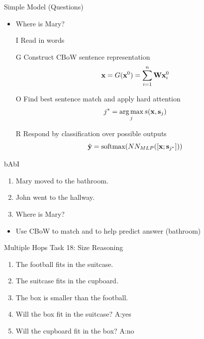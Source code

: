 \documentclass{beamer}
\begin{document}
\begin{frame}{Simple Model (Questions)}
  \begin{itemize}
  \item Where is Mary?
  \end{itemize}

  \begin{itemize}
  \item[I] Read in words
  \item[G] Construct CBoW sentence representation 
    \[\mathbf{x} = G(\mathbf{x}^0) =  \sum_{i=1}^n \mathbf{W} \mathbf{x}^0_i\]
  \item[O] Find best sentence match and apply hard attention
    \[j^* = \argmax_j s(\boldx, \bolds_j) \] 
  \item[R] Respond by classification over possible outputs
    \[\hat{\boldy} =\softmax(NN_{MLP}([\boldx; \bolds_{j^*}])) \]
  \end{itemize}
\end{frame}

\begin{frame}{bAbI}
  \begin{enumerate}
  \item \alert{Mary moved to the bathroom.}  
  \item John went to the hallway.  
  \item Where is Mary?
  \end{enumerate}
  
  \begin{itemize}
  \item Use CBoW to match and to help predict answer (bathroom)
  \end{itemize}
\end{frame}


\begin{frame}{Multiple Hops}
Task 18: Size Reasoning 
  \begin{enumerate}
  \item The football fits in the suitcase.
  \item The suitcase fits in the cupboard.  
  \item The box is smaller than the football.  
  \item Will the box fit in the suitcase? A:yes 
  \item Will the cupboard fit in the box? A:no
  \end{enumerate}
\end{frame}
\end{document}
